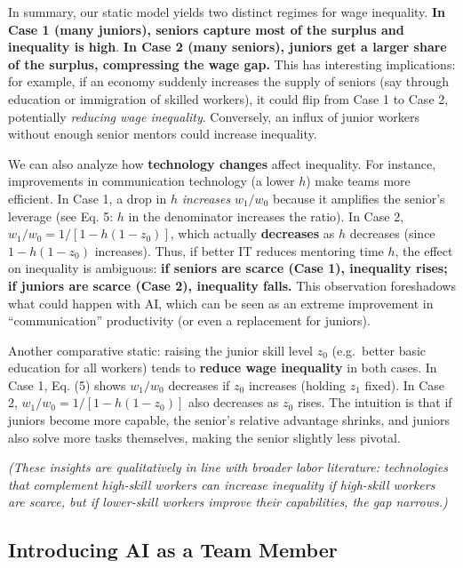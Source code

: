 \documentclass[12pt]{article}
\begin{document}
In summary, our static model yields two distinct regimes for wage
inequality. \textbf{In Case 1 (many juniors), seniors capture most of
the surplus and inequality is high}. \textbf{In Case 2 (many seniors),
juniors get a larger share of the surplus, compressing the wage gap.}
This has interesting implications: for example, if an economy suddenly
increases the supply of seniors (say through education or immigration of
skilled workers), it could flip from Case 1 to Case 2, potentially
\emph{reducing wage inequality}. Conversely, an influx of junior workers
without enough senior mentors could increase inequality.

We can also analyze how \textbf{technology changes} affect inequality.
For instance, improvements in communication technology (a lower \(h\))
make teams more efficient. In Case 1, a drop in \(h\) \emph{increases}
\(w_1/w_0\) because it amplifies the senior's leverage (see Eq. 5: \(h\)
in the denominator increases the ratio). In Case 2,
\(w_1/w_0 = 1/[1-h(1-z_0)]\), which actually \textbf{decreases} as \(h\)
decreases (since \(1 - h(1-z_0)\) increases). Thus, if better IT reduces
mentoring time \(h\), the effect on inequality is ambiguous: \textbf{if
seniors are scarce (Case 1), inequality rises; if juniors are scarce
(Case 2), inequality falls.} This observation foreshadows what could
happen with AI, which can be seen as an extreme improvement in
``communication'' productivity (or even a replacement for juniors).

Another comparative static: raising the junior skill level \(z_0\)
(e.g.~better basic education for all workers) tends to \textbf{reduce
wage inequality} in both cases. In Case 1, Eq. (5) shows \(w_1/w_0\)
decreases if \(z_0\) increases (holding \(z_1\) fixed). In Case 2,
\(w_1/w_0 = 1/[1-h(1-z_0)]\) also decreases as \(z_0\) rises. The
intuition is that if juniors become more capable, the senior's relative
advantage shrinks, and juniors also solve more tasks themselves, making
the senior slightly less pivotal.

\emph{(These insights are qualitatively in line with broader labor
literature: technologies that complement high-skill workers can increase
inequality if high-skill workers are scarce, but if lower-skill workers
improve their capabilities, the gap narrows.)}

\subsection{Introducing AI as a Team
Member}\label{introducing-ai-as-a-team-member}
\end{document}
